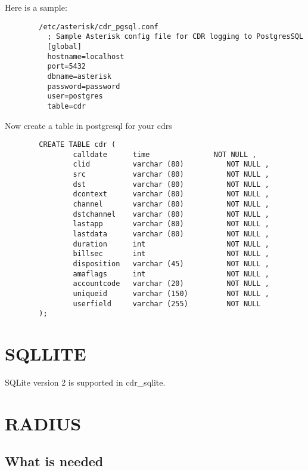        Here is a sample:
\begin{astlisting}
\begin{verbatim}
        /etc/asterisk/cdr_pgsql.conf
          ; Sample Asterisk config file for CDR logging to PostgresSQL
          [global]
          hostname=localhost
          port=5432
          dbname=asterisk
          password=password
          user=postgres
          table=cdr
\end{verbatim}
\end{astlisting}
        Now create a table in postgresql for your cdrs
\begin{astlisting}
\begin{verbatim}
        CREATE TABLE cdr (
                calldate      time               NOT NULL ,
                clid          varchar (80)          NOT NULL ,
                src           varchar (80)          NOT NULL ,
                dst           varchar (80)          NOT NULL ,
                dcontext      varchar (80)          NOT NULL ,
                channel       varchar (80)          NOT NULL ,
                dstchannel    varchar (80)          NOT NULL ,
                lastapp       varchar (80)          NOT NULL ,
                lastdata      varchar (80)          NOT NULL ,
                duration      int                   NOT NULL ,
                billsec       int                   NOT NULL ,
                disposition   varchar (45)          NOT NULL ,
                amaflags      int                   NOT NULL ,
                accountcode   varchar (20)          NOT NULL ,
                uniqueid      varchar (150)         NOT NULL ,
                userfield     varchar (255)         NOT NULL
        );
\end{verbatim}
\end{astlisting}

\section{SQLLITE}

SQLite version 2 is supported in cdr\_sqlite.

\section{RADIUS}

\subsection{What is needed}

